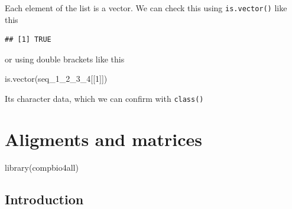 \documentclass[
]{book}
\newenvironment{Shaded}{\begin{snugshade}}{\end{snugshade}}
\newcommand{\CommentTok}[1]{\textcolor[rgb]{0.56,0.35,0.01}{\textit{#1}}}
\newcommand{\DecValTok}[1]{\textcolor[rgb]{0.00,0.00,0.81}{#1}}
\newcommand{\FunctionTok}[1]{\textcolor[rgb]{0.00,0.00,0.00}{#1}}
\newcommand{\NormalTok}[1]{#1}
\newcommand{\SpecialCharTok}[1]{\textcolor[rgb]{0.00,0.00,0.00}{#1}}
\begin{document}
Each element of the list is a vector. We can check this using \texttt{is.vector()} like this

\begin{Shaded}
\end{Shaded}

\begin{verbatim}
## [1] TRUE
\end{verbatim}

or using double brackets like this

\begin{Shaded}
\begin{Highlighting}[]
\FunctionTok{is.vector}\NormalTok{(seq\_1\_2\_3\_4[[}\DecValTok{1}\NormalTok{]])}
\end{Highlighting}
\end{Shaded}

Its character data, which we can confirm with \texttt{class()}

\begin{Shaded}
\end{Shaded}

\hypertarget{aligments-and-matrices}{%
\chapter{Aligments and matrices}\label{aligments-and-matrices}}

\begin{Shaded}
\begin{Highlighting}[]
\FunctionTok{library}\NormalTok{(compbio4all)}
\end{Highlighting}
\end{Shaded}

\hypertarget{introduction-1}{%
\section{Introduction}\label{introduction-1}}
\end{document}

